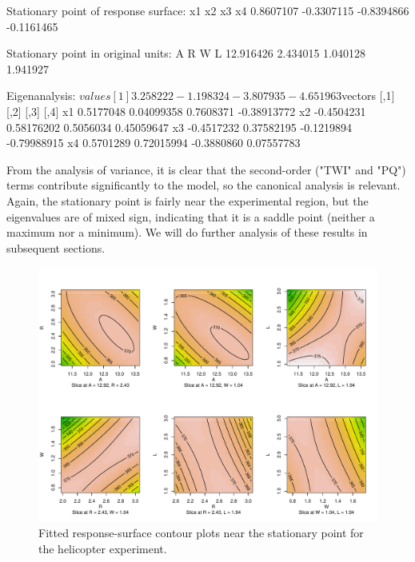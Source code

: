 \documentclass[article,nojss]{jss}
\begin{document}
\begin{Schunk}
\begin{Soutput}
Stationary point of response surface:
        x1         x2         x3         x4 
 0.8607107 -0.3307115 -0.8394866 -0.1161465 

Stationary point in original units:
        A         R         W         L 
12.916426  2.434015  1.040128  1.941927 

Eigenanalysis:
$values
[1]  3.258222 -1.198324 -3.807935 -4.651963

$vectors
         [,1]       [,2]       [,3]        [,4]
x1  0.5177048 0.04099358  0.7608371 -0.38913772
x2 -0.4504231 0.58176202  0.5056034  0.45059647
x3 -0.4517232 0.37582195 -0.1219894 -0.79988915
x4  0.5701289 0.72015994 -0.3880860  0.07557783
\end{Soutput}
\end{Schunk}
From the analysis of variance, it is clear that the second-order ("TWI" and "PQ") terms contribute significantly to the model, so the canonical analysis is relevant.  Again, the stationary point is fairly near the experimental region, but the eigenvalues are of mixed sign, indicating that it is a saddle point (neither a maximum nor a minimum).  We will do further analysis of these results in subsequent sections.



\begin{figure}
\includegraphics[width=.8\textwidth]{rsm-fig6.pdf}
\caption{\label{heliplots} Fitted response-surface contour plots near the stationary point for the helicopter experiment.}
\end{figure}
%
\end{document}
